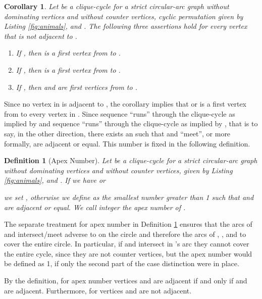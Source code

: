 \documentclass[10pt]{article}
\newtheorem{corollary}[theorem]{Corollary}
\newtheorem{definition}[theorem]{Definition}
\newcommand{\q}[1]{``#1''}\newcommand{\fu}[1]{\mathcal{#1}}\newcommand{\mc}[1]{\mathsf{#1}}\newcommand{\ri}[1]{\mathscr{#1}}\newcommand{\co}[1]{\fu{C}({#1})}\newcommand{\lc}[1]{\alpha(#1)}\newcommand{\rc}[1]{\beta(#1)}\newcommand{\ema}[1]{\mathcal{#1}}\newcommand{\fe}[2]{\fu{F}(#1,#2)}\newcommand{\lv}[1]{l_{#1}}\newcommand{\rv}[1]{r_{#1}}\newcommand{\mv}[1]{m_{#1}}\newcommand{\lvv}{\lv{v}}
\begin{document}
\begin{corollary}\label{b}
Let  be a clique-cycle for a strict circular-arc 
graph  without dominating vertices and without counter 
vertices, cyclic permutation 
 given by Listing \ref{fig:animals}, 
and . The following three assertions hold for every 
vertex  that is not adjacent to .
\begin{enumerate}
\item\label{jans}
If
, then  is a first vertex from  to .
\item\label{jans2}
If
, then  is a first vertex from  to .
\item\label{jans3}
If
, then  and  are first vertices from  to .
\end{enumerate}
\end{corollary}






Since no vertex in  is adjacent to , the corollary implies that  or  is a 
first vertex from  to every vertex in .
Since sequence 
 \q{runs} through the clique-cycle as 
implied by  and sequence 
 \q{runs} through the clique-cycle as 
implied by , that is to say, in the other direction, 
there exists an  such that  and  \q{meet}, 
or more formally, are adjacent or equal. 
This number is fixed in the following definition. 



\begin{definition}[Apex Number]\label{apex}
Let  be a clique-cycle for a strict cir\-cular-arc graph  
without dominating vertices and without counter vertices, 
 given by Listing \ref{fig:animals}, and .
If we have  or 
 
we set , 
otherwise we define  as the smallest number greater than 1 
such that  and  are adjacent or equal.
We call integer  the \emph{apex number of }.
\end{definition}


The separate treatment for apex number  in Definition \ref{apex} ensures that the 
arcs of  and  intersect/meet adverse to  on the 
circle and therefore the arcs of , ,
and  to cover the entire circle.
In particular, if  and  intersect in 's arc they cannot 
cover the entire cycle, since they are not counter vertices, but the apex 
number would be defined as 1, if only the second part of the case distinction were in place.






By the definition, for apex number  vertices  and  are 
adjacent if and only if  and  are adjacent.
Furthermore, for  vertices  and  are not adjacent.
\end{document}
